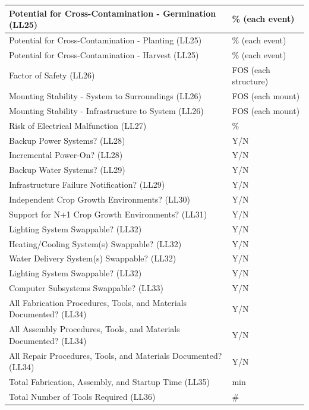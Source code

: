 \documentclass{report}
\newcounter{metricnumber}
\newcommand\rownumber{\stepcounter{metricnumber}\arabic{metricnumber}}
\begin{document}
\begin{center}
\begin{tabular}{| @{\makebox[2em][l]{\rownumber}} | l | l |}
        \hline
        Potential for Cross-Contamination - Germination \hfill (LL25) & \% (each event)\\
        \hline
        Potential for Cross-Contamination - Planting \hfill (LL25) & \% (each event)\\
        \hline
        Potential for Cross-Contamination - Harvest \hfill (LL25) & \% (each event)\\
        \hline
        Factor of Safety \hfill (LL26) & FOS (each structure)\\
        \hline
        Mounting Stability - System to Surroundings \hfill (LL26) & FOS (each mount) \\
        \hline
        Mounting Stability - Infrastructure to System \hfill (LL26) & FOS (each mount) \\
        \hline
        Risk of Electrical Malfunction \hfill (LL27) & \% \\
        \hline
        Backup Power Systems? \hfill (LL28) & Y/N \\
        \hline
        Incremental Power-On? \hfill (LL28) & Y/N \\
        \hline
        Backup Water Systems? \hfill (LL29) & Y/N \\
        \hline
        Infrastructure Failure Notification? \hfill (LL29) & Y/N \\
        \hline
        Independent Crop Growth Environments? \hfill (LL30) & Y/N \\
        \hline
        Support for N+1 Crop Growth Environments? \hfill (LL31) & Y/N \\
        \hline
        Lighting System Swappable? \hfill (LL32) & Y/N \\
        \hline
        Heating/Cooling System(s) Swappable? \hfill (LL32) & Y/N \\
        \hline
        Water Delivery System(s) Swappable? \hfill (LL32) & Y/N \\
        \hline
        Lighting System Swappable? \hfill (LL32) & Y/N \\
        \hline
        Computer Subsystems Swappable? \hfill (LL33) & Y/N \\
        \hline
        All Fabrication Procedures, Tools, and Materials Documented? \hfill (LL34) & Y/N \\
        \hline
        All Assembly Procedures, Tools, and Materials Documented? \hfill (LL34) & Y/N \\
        \hline
        All Repair Procedures, Tools, and Materials Documented? \hfill (LL34) & Y/N \\
        \hline
        Total Fabrication, Assembly, and Startup Time \hfill (LL35) & min \\
        \hline
        Total Number of Tools Required \hfill (LL36) & \# \\
        \hline
    \end{tabular}
\end{center}
\end{document}
